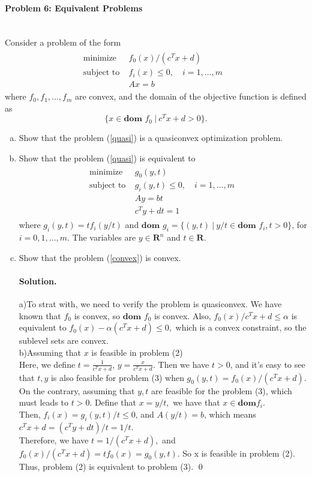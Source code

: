 \documentclass[a4paper]{article}
\newenvironment{solution}
{\color{blue} \paragraph{Solution.\\}}
{\newline \qed}
\begin{document}
\paragraph{Problem 6: Equivalent Problems}
~\\
Consider a problem of the form
\begin{gather}
\label{quasi}
\begin{matrix}
\text{minimize~~} & f_0(x)/\left(c^Tx+d\right)\quad\quad\quad~\\
\text{subject to} & f_i(x)\leq0,\quad i=1,\dots,m\\
&Ax=b\quad\quad\quad\quad\quad\quad\quad~~
\end{matrix}
\end{gather}
where $f_0,f_1,\dots,f_m$ are convex, and the domain of the objective function is defined as \[\{x\in\textbf{dom } f_0 ~|~c^Tx+d>0\}.\]
\begin{enumerate}[a)]
    \item Show that the problem (\ref{quasi}) is a quasiconvex optimization problem.
    \item Show that the problem (\ref{quasi}) is equivalent to
    \begin{gather}
    \label{convex}
\begin{matrix}
\text{minimize~~} & g_0(y,t)\quad\quad\quad\quad\quad\quad\quad\quad~\\
\text{subject to} & g_i(y,t)\leq0,\quad i=1,\dots,m\\
&Ay=bt\quad\quad\quad\quad\quad\quad\quad\quad\\
&c^Ty+dt=1\quad\quad\quad\quad\quad~~
\end{matrix}
\end{gather}
where $g_i(y,t)=tf_i(y/t)$ and $\textbf{dom }g_i=\{(y,t)~|~y/t\in\textbf{dom }f_i,t>0\}$, for $i=0,1,\dots,m$. The variables are $y\in\mathbf{R}^n$ and $t\in\mathbf{R}$.
  \item Show that the problem (\ref{convex}) is convex.
\begin{solution}
	a)\;To strat with, we need to verify the problem is quasiconvex. We have known that $f_0$ is convex, so $\textbf{dom }f_0$ is convex. Also, $f_0(x)/c^Tx+d\leq\alpha$ is equivalent to $f_0(x)-\alpha(c^Tx+d)\leq 0,$ which is a convex constraint, so the sublevel sets are convex.  \\ 
	b)\;Assuming that $x$ is feasible in problem (2)\\Here, we define $t=\frac{1}{c^Tx+d}$, $y=\frac{x}{c^Tx+d}.$ Then we have $t>0$, and it's easy to see that $t,y$ is also feasible for problem (3) when $g_0(y,t)=f_0(x)/(c^Tx+d)$.\\
	On the contrary, assuming that $y,t$ are feasible for the problem (3), which must leads to $t>0$. Define that $x=y/t,$ we have that $x\in \mathbf{dom }f_i$.\\
	Then, $f_i(x)=g_i(y,t)/t \leq 0$, and $A(y/t)=b$, which means $c^Tx+d=(c^Ty+dt)/t=1/t$. \\Therefore, we have $t=1/(c^Tx+d),$ and $f_0(x)/(c^Tx+d)=tf_0(x)=g_0(y,t)$. So x is feasible in problem (2). Thus, problem (2) is equivalent to problem (3). 
\end{solution}
\end{enumerate}
\end{document}
